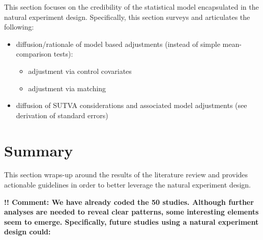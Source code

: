 \documentclass[nobib]{tufte-handout}
\begin{document}
\begin{refsection}
\noindent This section focuses on the credibility of the statistical model
encapsulated in the natural experiment design. Specifically, this section surveys and articulates the following:

\begin{itemize}
    \item diffusion/rationale of model based adjustments (instead of simple
        mean-comparison tests):
        \begin{itemize}
            \item adjustment via control covariates
            \item adjustment via matching
        \end{itemize}
    \item diffusion of SUTVA considerations and associated model adjustments
        (see derivation of standard errors)
\end{itemize}


%
%
%
%
%
%
%
%
%
%
%
%

\section{Summary}

\noindent This section wraps-up around the results of the literature review and
provides actionable guidelines in order to better leverage the natural
experiment design.

\noindent \textbf{!! Comment: We have already coded the 50 studies. Although
    further analyses are needed to reveal clear patterns, some interesting
    elements seem to emerge. Specifically, future studies using a natural
    experiment design could:}


\end{refsection}
\end{document}

